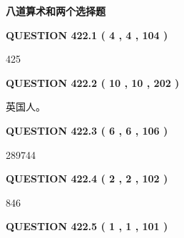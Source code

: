 \documentclass{ctexart}
\begin{document}
   
\vspace{0.2in}
   
   
   
   
   
   
 \vspace{0.2in}
{\LARGE {\textbf{ 八道算术和两个选择题}}}
   
   
  
\vspace{0.2in}
  
{\textbf{\Large{QUESTION
422.1 
 ( 4 , 4 , 104 )
}}}
  
  
 
 
\noindent{}

425
 
 
  
\vspace{0.2in}
  
{\textbf{\Large{QUESTION
422.2 
 ( 10 , 10 , 202 )
}}}
  
  
 
 
\noindent{}
 
 
英国人。
 
 
 
 
  
\vspace{0.2in}
  
{\textbf{\Large{QUESTION
422.3 
 ( 6 , 6 , 106 )
}}}
  
  
 
 
\noindent{}

289744
 
 
  
\vspace{0.2in}
  
{\textbf{\Large{QUESTION
422.4 
 ( 2 , 2 , 102 )
}}}
  
  
 
 
\noindent{}

846
 
 
  
\vspace{0.2in}
  
{\textbf{\Large{QUESTION
422.5 
 ( 1 , 1 , 101 )
}}}
  
\end{document}

